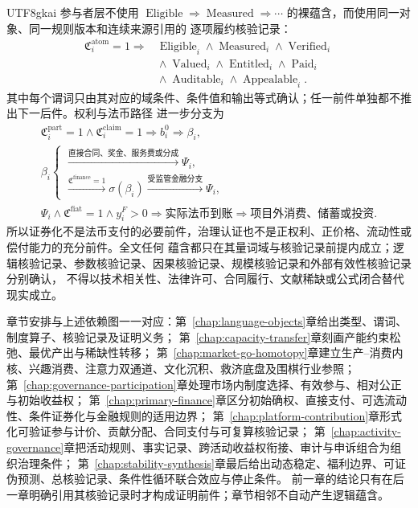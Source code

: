 \documentclass[12pt,a4paper,openany]{report}
\DeclareMathOperator{\Eligible}{Eligible}
\DeclareMathOperator{\Measured}{Measured}
\DeclareMathOperator{\Verified}{Verified}
\DeclareMathOperator{\Valued}{Valued}
\DeclareMathOperator{\Entitled}{Entitled}
\DeclareMathOperator{\Paid}{Paid}
\DeclareMathOperator{\Auditable}{Auditable}
\DeclareMathOperator{\Appealable}{Appealable}
\begin{document}
\begin{CJK*}{UTF8}{gkai}
参与者层不使用
\(\Eligible\Rightarrow\Measured\Rightarrow\cdots\) 的裸蕴含，而使用同一对象、同一规则版本和连续来源引用的
逐项履约核验记录：
\[
\boxed{
\begin{aligned}
  \mathfrak C_i^{\mathrm{atom}}=1
  \Longrightarrow{}&
  \Eligible_i\wedge\Measured_i\wedge\Verified_i\\
  &{}\wedge\Valued_i\wedge\Entitled_i\wedge\Paid_i\\
  &{}\wedge\Auditable_i\wedge\Appealable_i.
\end{aligned}}
\]
其中每个谓词只由其对应的域条件、条件值和输出等式确认；任一前件单独都不推出下一后件。权利与法币路径
进一步分支为
\[
\boxed{
\begin{gathered}
  \mathfrak C_i^{\mathrm{part}}=1
  \wedge\mathfrak C_i^{\mathrm{claim}}=1
  \Longrightarrow b_i^0\Longrightarrow\beta_i,\\
  \beta_i
  \begin{cases}
    \xrightarrow{\text{直接合同、奖金、服务费或分成}}\Psi_i,\\
    \xrightarrow{\mathfrak C^{\mathrm{finance}}=1}\sigma(\beta_i)
    \xrightarrow{\text{受监管金融分支}}\Psi_i,
  \end{cases}\\
  \Psi_i\wedge\mathfrak C^{\mathrm{fiat}}=1
  \wedge y_i^F>0
  \Longrightarrow
  \text{实际法币到账}
  \Longrightarrow
  \text{项目外消费、储蓄或投资}.
\end{gathered}}
\]
所以证券化不是法币支付的必要前件，治理认证也不是正权利、正价格、流动性或偿付能力的充分前件。全文任何
蕴含都只在其量词域与核验记录前提内成立；逻辑核验记录、参数核验记录、因果核验记录、规模核验记录和外部有效性核验记录分别确认，
不得以技术相关性、法律许可、合同履行、文献稀缺或公式闭合替代现实成立。

章节安排与上述依赖图一一对应：第~\ref{chap:language-objects}章给出类型、谓词、制度算子、核验记录及证明义务；
第~\ref{chap:capacity-transfer}章刻画产能约束松弛、最优产出与稀缺性转移；
第~\ref{chap:market-go-homotopy}章建立生产--消费内核、兴趣消费、注意力双通道、文化沉积、救济底盘及围棋行业参照；
第~\ref{chap:governance-participation}章处理市场内制度选择、有效参与、相对公正与初始收益权；
第~\ref{chap:primary-finance}章区分初始确权、直接支付、可选流动性、条件证券化与金融规则的适用边界；
第~\ref{chap:platform-contribution}章形式化可验证参与计价、贡献分配、合同支付与可复算核验记录；
第~\ref{chap:activity-governance}章把活动规则、事实记录、跨活动收益权衔接、审计与申诉组合为组织治理条件；
第~\ref{chap:stability-synthesis}章最后给出动态稳定、福利边界、可证伪预测、总核验记录、条件性循环联合效应与停止条件。
前一章的结论只有在后一章明确引用其核验记录时才构成证明前件；章节相邻不自动产生逻辑蕴含。


\end{CJK*}
\end{document}

